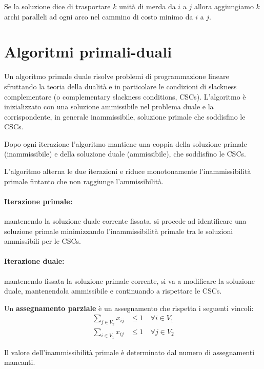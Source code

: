 \documentclass[\main/main.tex]{subfiles}
\begin{document}
Se la soluzione dice di trasportare \(k\) unità di merda da \(i\) a \(j\) allora aggiungiamo \(k\) archi paralleli ad ogni arco nel cammino di costo minimo da \(i\) a \(j\).
\clearpage
\section{Algoritmi primali-duali}
Un algoritmo primale duale risolve problemi di programmazione lineare sfruttando la teoria della dualità e in particolare le condizioni di slackness complementare (o complementary slackness conditions, CSCs). L'algoritmo è inizializzato con una soluzione ammissibile nel problema duale e la corrispondente, in generale inammissibile, soluzione primale che soddisfino le CSCs.

Dopo ogni iterazione l'algoritmo mantiene una coppia della soluzione primale (inammissibile) e della soluzione duale (ammissibile), che soddisfino le CSCs.

L'algoritmo alterna le due iterazioni e riduce monotonamente l'inammissibilità primale fintanto che non raggiunge l'ammissibilità.

\paragraph*{Iterazione primale:} mantenendo la soluzione duale corrente fissata, si procede ad identificare una soluzione primale minimizzando l'inammissibilità primale tra le soluzioni ammissibili per le CSCs.
\paragraph*{Iterazione duale:} mantenendo fissata la soluzione primale corrente, si va a modificare la soluzione duale, mantenendola ammissibile e continuando a rispettare le CSCs.

\begin{definition}
	Un \textbf{assegnamento parziale} è un assegnamento che rispetta i seguenti vincoli:
	\begin{align*}
		\sum_{j \in V_2} x_{ij} & \leq 1 \quad \forall i \in V_1 \\
		\sum_{i \in V_1} x_{ij} & \leq 1 \quad \forall j \in V_2
	\end{align*}
\end{definition}

\begin{definition}
	Il valore dell'inammissibilità primale è determinato dal numero di assegnamenti mancanti.
\end{definition}
\end{document}
